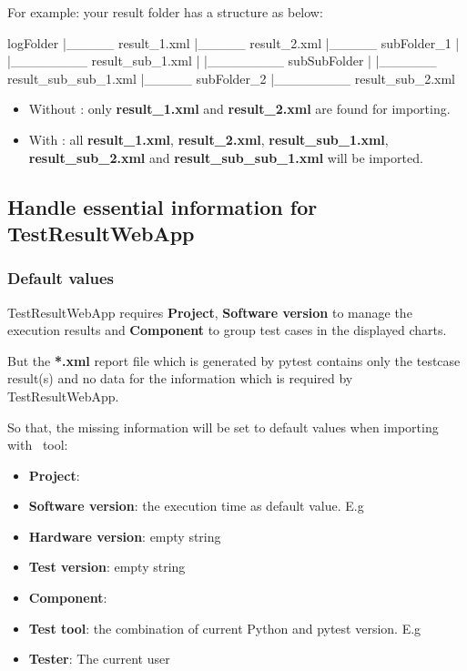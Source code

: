     For example: your result folder has a structure as below:

\begin{robotlog}
logFolder
   |_____ result_1.xml
   |_____ result_2.xml
   |_____ subFolder_1
   |         |________ result_sub_1.xml
   |         |________ subSubFolder
   |                       |______ result_sub_sub_1.xml
   |_____ subFolder_2
             |________ result_sub_2.xml
\end{robotlog}

    \begin{itemize}
    \tightlist
    \item
      Without : only \textbf{result\_1.xml} and
      \textbf{result\_2.xml} are found for importing.
    \item
      With : all \textbf{result\_1.xml},
      \textbf{result\_2.xml}, \textbf{result\_sub\_1.xml},
      \textbf{result\_sub\_2.xml} and \textbf{result\_sub\_sub\_1.xml} will
      be imported.
    \end{itemize}

  \hypertarget{handle-required-information}{%
  \subsection{Handle essential information for TestResultWebApp}
  \label{handle-required-information}}

  \hypertarget{default-values}{%
  \subsubsection{Default values}
  \label{default-values}}
    TestResultWebApp requires \textbf{Project}, \textbf{Software version} to 
    manage the execution results and \textbf{Component} to group test cases in 
    the displayed charts.

    But the \textbf{*.xml} report file which is generated by pytest contains
    only the testcase result(s) and no data for the information which is 
    required by TestResultWebApp.

    So that, the missing information will be set to default values when 
    importing with \pkg\ tool:

\begin{itemize}
\tightlist
\item
  \textbf{Project}: 
\item
  \textbf{Software version}: the execution time 
   as default value. 
   E.g 
\item
  \textbf{Hardware version}: empty string
\item
  \textbf{Test version}: empty string
\item
  \textbf{Component}: 
\item
  \textbf{Test tool}: the combination of current Python and pytest version.
  E.g 
\item
  \textbf{Tester}: The current user
\end{itemize}

